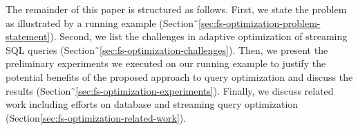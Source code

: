 The remainder of this paper is structured as follows. First, we state the problem as illustrated by a running example (Section˜\ref{sec:fs-optimization-problem-statement}). 
Second, we list the challenges in adaptive optimization of streaming SQL queries (Section˜\ref{sec:fs-optimization-challenges}). 
Then, we present the preliminary experiments we executed on our running example to justify the potential benefits of the proposed approach to query optimization and discuss the results (Section˜\ref{sec:fs-optimization-experiments}). 
Finally, we discuss related work including efforts on database and streaming query optimization (Section\ref{sec:fs-optimization-related-work}).     
